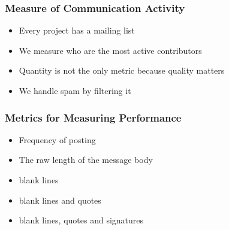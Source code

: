\documentclass[compress]{beamer}
\begin{document}
\begin{frame}
  \frametitle{Measure of Communication Activity}

  \begin{itemize}
     \item Every project has a mailing list
     \item We measure who are the most active contributors
     \item Quantity is not the only metric because quality matters 
     \item We handle spam by filtering it
  \end{itemize}

\end{frame}

\begin{frame}
 \frametitle{Metrics for Measuring Performance}

 \begin{itemize}
    \item Frequency of posting 
    \item The raw length of the message body 
    \item blank lines 
    \item blank lines and quotes
    \item blank lines, quotes and signatures
 \end{itemize}
\end{frame}
\end{document}

